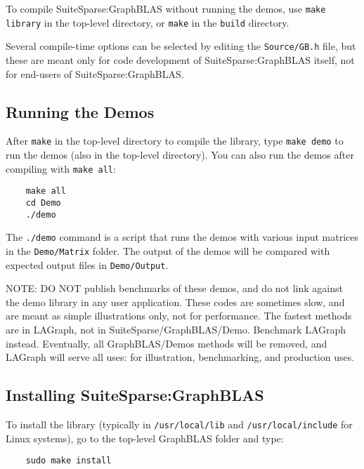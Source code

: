 \documentclass[12pt]{article}
\begin{document}
To compile SuiteSparse:GraphBLAS without running the demos, use \newline
\verb'make library' in the top-level directory, or \verb'make' in the
\verb'build' directory.

Several compile-time options can be selected by editing the \verb'Source/GB.h'
file, but these are meant only for code development of SuiteSparse:GraphBLAS
itself, not for end-users of SuiteSparse:GraphBLAS.

\subsection{Running the Demos}

After \verb'make' in the top-level directory to compile the library, type
\verb'make demo' to run the demos (also in the top-level directory).
You can also run the demos after compiling with \verb'make all':

    {\small
    \begin{verbatim}
    make all
    cd Demo
    ./demo \end{verbatim} }

The \verb'./demo' command is a script that runs the demos with various input
matrices in the \verb'Demo/Matrix' folder.  The output of the demos will be
compared with expected output files in \verb'Demo/Output'.

NOTE:
DO NOT publish benchmarks of these demos, and do not link against the
demo library in any user application.  These codes are sometimes slow,
and are meant as simple illustrations only, not for performance.  The fastest
methods are in LAGraph, not in SuiteSparse/GraphBLAS/Demo.  Benchmark LAGraph
instead.  Eventually, all GraphBLAS/Demos methods will be removed, and LAGraph
will serve all uses: for illustration, benchmarking, and production uses.

\subsection{Installing SuiteSparse:GraphBLAS}

To install the library (typically in \verb'/usr/local/lib' and
\verb'/usr/local/include' for Linux systems), go to the top-level GraphBLAS
folder and type:

    {\small
    \begin{verbatim}
    sudo make install \end{verbatim} }
\end{document}
